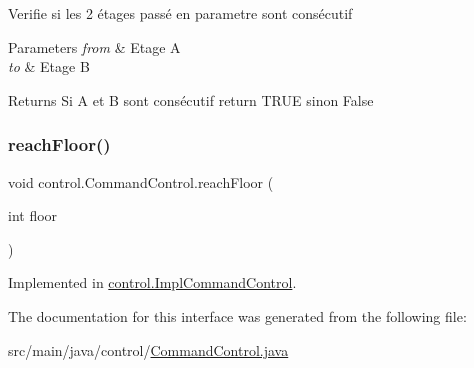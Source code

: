 Verifie si les 2 étages passé en parametre sont consécutif 
\begin{DoxyParams}{Parameters}
{\em from} & Etage A \\
\hline
{\em to} & Etage B \\
\hline
\end{DoxyParams}
\begin{DoxyReturn}{Returns}
Si A et B sont consécutif return T\+R\+UE sinon False 
\end{DoxyReturn}
\mbox{\label{interfacecontrol_1_1_command_control_aed88af210353f0e854d6da8af1089851}} 
\subsubsection{\texorpdfstring{reachFloor()}{reachFloor()}}
{\footnotesize\ttfamily void control.\+Command\+Control.\+reach\+Floor (\begin{DoxyParamCaption}\item[{int}]{floor }\end{DoxyParamCaption})}



Implemented in \mbox{\hyperlink{classcontrol_1_1_impl_command_control_a5736ac91cdc39805dc27c6af0c9935cb}{control.\+Impl\+Command\+Control}}.



The documentation for this interface was generated from the following file\+:\begin{DoxyCompactItemize}
\item 
src/main/java/control/\mbox{\hyperlink{_command_control_8java}{Command\+Control.\+java}}\end{DoxyCompactItemize}
